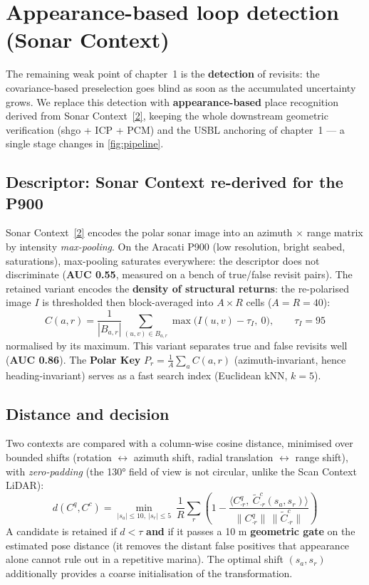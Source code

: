 \section{Appearance-based loop detection (Sonar Context)}
\label{sec:chap2}

The remaining weak point of chapter~1 is the \textbf{detection} of revisits: the
covariance-based preselection goes blind as soon as the accumulated uncertainty
grows. We replace this detection with \textbf{appearance-based} place recognition
derived from Sonar Context~\hyperref[bib:sonarcontext]{[2]}, keeping the whole downstream geometric verification
(shgo + ICP + PCM) and the USBL anchoring of chapter~1 — a single stage changes in
\autoref{fig:pipeline}.

\subsection{Descriptor: Sonar Context re-derived for the P900}
\label{sec:sc-desc}

Sonar Context~\hyperref[bib:sonarcontext]{[2]} encodes the polar sonar image into an azimuth $\times$ range matrix
by intensity \emph{max-pooling}. On the Aracati P900 (low resolution, bright seabed,
saturations), max-pooling saturates everywhere: the descriptor does not discriminate
(\textbf{AUC 0.55}, measured on a bench of true/false revisit pairs). The retained
variant encodes the \textbf{density of structural returns}: the re-polarised image
$I$ is thresholded then block-averaged into $A \times R$ cells ($A = R = 40$):
\begin{equation}
C(a, r) = \frac{1}{|B_{a,r}|} \sum_{(u,v) \in B_{a,r}} \max\big(I(u,v) - \tau_I,\ 0\big),
\qquad \tau_I = 95
\end{equation}
normalised by its maximum. This variant separates true and false revisits well
(\textbf{AUC 0.86}). The \textbf{Polar Key} $P_r = \frac{1}{A}\sum_a C(a,r)$
(azimuth-invariant, hence heading-invariant) serves as a fast search index
(Euclidean kNN, $k = 5$).

\subsection{Distance and decision}
\label{sec:sc-dist}

Two contexts are compared with a column-wise cosine distance, minimised over bounded
shifts (rotation $\leftrightarrow$ azimuth shift, radial translation
$\leftrightarrow$ range shift), with \emph{zero-padding} (the 130° field of view is
not circular, unlike the Scan Context LiDAR):
\begin{equation}
d(C^q, C^c) = \min_{|s_a| \le 10,\ |s_r| \le 5}\ \frac{1}{R} \sum_{r}
\left(1 - \frac{\langle C^q_{\cdot r},\ \tilde{C}^c_{\cdot r}(s_a, s_r)\rangle}
{\lVert C^q_{\cdot r}\rVert\,\lVert \tilde{C}^c_{\cdot r}\rVert}\right)
\end{equation}
A candidate is retained if $d < \tau$ \textbf{and} if it passes a 10 m
\textbf{geometric gate} on the estimated pose distance (it removes the distant false
positives that appearance alone cannot rule out in a repetitive marina). The optimal
shift $(s_a, s_r)$ additionally provides a coarse initialisation of the
transformation.

